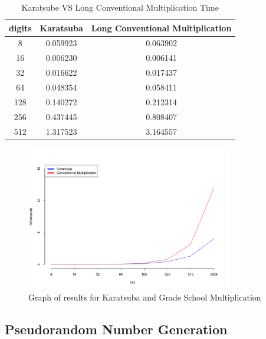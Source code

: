 \documentclass[12pt,journal,compsoc]{IEEEtran}
\begin{document}
\begin{table}[ht]
	\begin{center}
	\begin{tabular}{|c|c|c|}
    	\hline
       		digits 	&		Karatsuba					&	Long Conventional Multiplication\\
	\hline
    		8		&		0.059923					&	0.063902 \\
		16		&		0.006230					&	0.006141 \\
		32		&		0.016622					&	0.017437 \\
		64		&		0.048354					&	0.058411 \\
		128		&		0.140272					&	0.212314 \\
		256		&		0.437445					&	0.808407 \\
		512		&		1.317523					&	3.164557 \\
	\hline
	\end{tabular}
	\end{center}
	\caption{Karatsube VS Long Conventional Multiplication Time}
	\label{table:karatsubaVSgrade}

\end{table}

\begin{figure}[ht!]
\centering
\includegraphics[width=90mm]{images/karatsubaVSgradeSchool.pdf}
\caption{Graph of results for Karatsuba and Grade School Multiplication}
\label{fig:karatsubaVSgrade}
\end{figure}


\subsection{{Pseudorandom Number Generation}}
\label{sec:mersenne}
\end{document}

